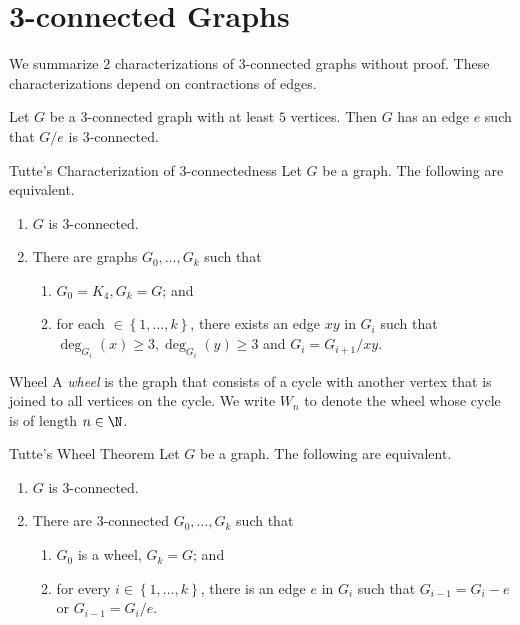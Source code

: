 \documentclass[co342]{subfiles}
\begin{document}
    \section{3-connected Graphs}

    \np We summarize $2$ characterizations of $3$-connected graphs without proof. These characterizations depend on contractions of edges.
    
    \begin{prop}{}
        Let $G$ be a $3$-connected graph with at least $5$ vertices. Then $G$ has an edge $e$ such that $G /e$ is $3$-connected.
    \end{prop}

    \begin{cor}{Tutte's Characterization of $3$-connectedness}
        Let $G$ be a graph. The following are equivalent.
        \begin{enumerate}
            \item $G$ is $3$-connected.
            \item There are graphs $G_0,\ldots,G_k$ such that
                \begin{enumerate}
                    \item $G_0=K_4, G_k=G$; and
                    \item for each $\in\left\lbrace 1,\ldots,k \right\rbrace$, there exists an edge $xy$ in $G_i$ such that $\deg_{G_i}\left( x \right)\geq 3, \deg_{G_i}\left( y \right)\geq 3$ and $G_i = G_{i+1}/xy$.
                \end{enumerate}
        \end{enumerate}
    \end{cor}	

    \begin{definition}{Wheel}{}
        A \emph{wheel} is the graph that consists of a cycle with another vertex that is joined to all vertices on the cycle. We write $W_n$ to denote the wheel whose cycle is of length $n\in\N$.
    \end{definition}

    \begin{theorem}{Tutte's Wheel Theorem}
        Let $G$ be a graph. The following are equivalent.
        \begin{enumerate}
            \item $G$ is $3$-connected.
            \item There are $3$-connected $G_0,\ldots,G_k$ such that
                \begin{enumerate}
                    \item $G_0$ is a wheel, $G_k=G$; and
                    \item for every $i\in\left\lbrace 1,\ldots,k \right\rbrace$, there is an edge $e$ in $G_i$ such that $G_{i-1}=G_i-e$ or $G_{i-1} = G_i /e$.
                \end{enumerate}
        \end{enumerate}
    \end{theorem}
\end{document}
